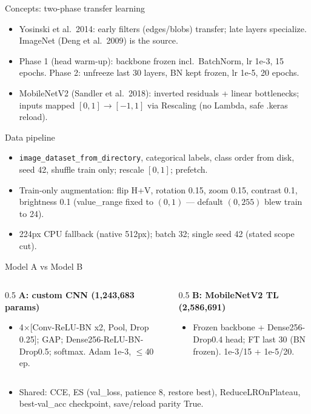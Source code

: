 \documentclass[aspectratio=169]{beamer}
\begin{document}
\begin{frame}{Concepts: two-phase transfer learning}
  \begin{itemize}
    \item Yosinski et al.\ 2014: early filters (edges/blobs) transfer; late layers specialize. ImageNet (Deng et al.\ 2009) is the source.
    \item Phase 1 (head warm-up): backbone frozen incl.\ BatchNorm, lr 1e-3, 15 epochs. Phase 2: unfreeze last 30 layers, BN kept frozen, lr 1e-5, 20 epochs.
    \item MobileNetV2 (Sandler et al.\ 2018): inverted residuals + linear bottlenecks; inputs mapped $[0,1]\to[-1,1]$ via Rescaling (no Lambda, safe .keras reload).
  \end{itemize}
\end{frame}
\begin{frame}{Data pipeline}
  \begin{itemize}
    \item \texttt{image\_dataset\_from\_directory}, categorical labels, class order from disk, seed 42, shuffle train only; rescale $[0,1]$; prefetch.
    \item Train-only augmentation: flip H+V, rotation 0.15, zoom 0.15, contrast 0.1, brightness 0.1 (value\_range fixed to $(0,1)$ --- default $(0,255)$ blew train to 24).
    \item 224px CPU fallback (native 512px); batch 32; single seed 42 (stated scope cut).
  \end{itemize}
\end{frame}
\begin{frame}{Model A vs Model B}
  \begin{columns}
    \begin{column}{0.5\textwidth}
      \textbf{A: custom CNN (1,243,683 params)}
      \begin{itemize}
        \item 4$\times$[Conv-ReLU-BN x2, Pool, Drop 0.25]; GAP; Dense256-ReLU-BN-Drop0.5; softmax. Adam 1e-3, $\le$40 ep.
      \end{itemize}
    \end{column}
    \begin{column}{0.5\textwidth}
      \textbf{B: MobileNetV2 TL (2,586,691)}
      \begin{itemize}
        \item Frozen backbone + Dense256-Drop0.4 head; FT last 30 (BN frozen). 1e-3/15 + 1e-5/20.
      \end{itemize}
    \end{column}
  \end{columns}
  \begin{itemize}
    \item Shared: CCE, ES (val\_loss, patience 8, restore best), ReduceLROnPlateau, best-val\_acc checkpoint, save/reload parity True.
  \end{itemize}
\end{frame}
\end{document}

